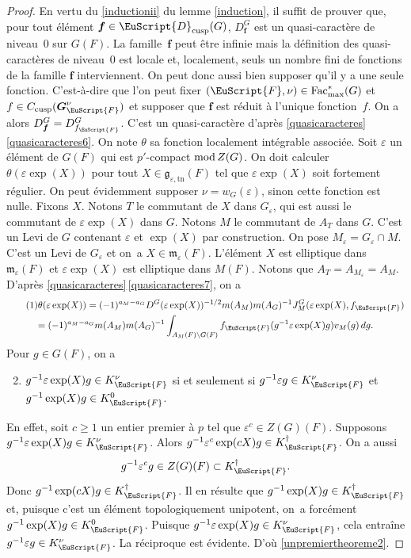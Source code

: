 \documentclass[JEP,XML,SOM,Unicode,francais]{cedram}
\let\mathcal \EuScript
\let\epsilon\varepsilon
\newcommand{\rmod}{\textup{mod}\,}
\newcommand{\frg}{\mathfrak{g}}
\newcommand{\mfrm}{\mathfrak{m}}
\newcommand{\cusp}{\mathrm{cusp}}
\newcommand{\Fac}{\mathrm{Fac}}
\newcommand{\tn}{\mathrm{tn}}
\newcommand{\bmf}{\boldsymbol{f}}
\newcommand{\bG}{\boldsymbol{G}}
\newcommand{\cD}{\mathcal{D}}
\newcommand{\cF}{\mathcal{F}}
\theoremstyle{plain}
\theoremstyle{definition}
\begin{document}
\begin{proof}
En vertu du \eqref{inductionii} du lemme \ref{induction}, il suffit de prouver que, pour tout élément $\bmf\in \cD_{\cusp}(G)$, $D^G_{\bmf}$ est un quasi-caractère de niveau~$0$ sur $G(F)$. La famille~$\bmf$ peut être infinie mais la définition des quasi-caractères de niveau~$0$ est locale et, loca\-lement, seuls un nombre fini de fonctions de la famille $\bmf$ interviennent. On peut donc aussi bien supposer qu'il y a une seule fonction. C'est-à-dire que l'on peut fixer $(\cF,\nu)\in \Fac^*_{\max}(G)$ et $f\in C_{\cusp}(\bG_{\cF}^{\nu})$ et supposer que $\bmf$ est réduit à l'unique fonction~$f$. On a alors $D^G_{\bmf}=D^G_{f_{\cF}}$. C'est un quasi-caractère d'après \ref{quasicaracteres}\,\eqref{quasicaracteres6}. On note $\theta$ sa fonction localement intégrable associée. Soit $\epsilon$ un élément de $G(F)$ qui est $p'$-compact $\rmod Z(G)$. On doit calculer $\theta(\epsilon \exp(X))$ pour tout $X\in \frg_{\epsilon,\tn}(F)$ tel que $\epsilon \exp(X)$ soit fortement régulier. On peut évidemment supposer $\nu=w_{G}(\epsilon)$, sinon cette fonction est nulle. Fixons $X$. Notons $T$ le commutant de $X$ dans $G_{\epsilon}$, qui est aussi le commutant de $\epsilon \exp(X)$ dans $G$. Notons $M$ le commutant de $A_{T}$ dans $G$. C'est un Levi de $G$ contenant $\epsilon$ et $\exp(X)$ par construction. On pose $M_{\epsilon}=G_{\epsilon}\cap M$. C'est un Levi de $G_{\epsilon}$ et on~a $X\in \mfrm_{\epsilon}(F)$. L'élément $X$ est elliptique dans $\mfrm_{\epsilon}(F)$ et $\epsilon \exp(X)$ est elliptique dans $M(F)$. Notons que $A_{T}=A_{M_{\epsilon}}=A_{M}$. D'après \ref{quasicaracteres}\,\eqref{quasicaracteres7}, on a
\begin{multline}\tag{1}\label{unpremiertheoreme1}
\theta(\epsilon \exp(X))=(-1)^{a_{M}-a_{G}}D^G(\epsilon \exp(X))^{-1/2}m(A_{M})m(A_{G})^{-1}J^G_{M}(\epsilon \exp(X),f_{\cF})
\\
=(-1)^{a_{M}-a_{G}}m(A_{M})m(A_{G})^{-1} \int_{A_{M}(F)\backslash G(F)}f_{\cF}(g^{-1} \epsilon \exp(X)g)v_{M}(g)\, dg.
\end{multline}
Pour $g\in G(F)$, on a
\begin{enumerate}\setcounter{enumi}{1}
\item\label{unpremiertheoreme2}
$g^{-1}\epsilon \exp(X)g\in K_{\cF}^{\nu}$ si et seulement si $g^{-1}\epsilon g\in K_{\cF}^{\nu}$ et $g^{-1} \exp(X)g\in K_{\cF}^0$.
\end{enumerate}

En effet, soit $c\geq1$ un entier premier à $p$ tel que $\epsilon^c\in Z(G)(F)$. Supposons $g^{-1}\epsilon \exp(X)g\in K_{\cF}^{\nu}$. Alors $g^{-1} \epsilon^c\exp(cX)g\in K_{\cF}^{\dag}$. On a aussi
\[
g^{-1}\epsilon^cg\in Z(G)(F)\subset K_{\cF}^{\dag}.
\]
Donc $g^{-1}\exp(cX)g\in K_{\cF}^{\dag}$. Il en résulte que $g^{-1}\exp(X)g\in K_{\cF}^{\dag}$ et, puisque c'est un élément topologiquement unipotent, on~a forcément $g^{-1}\exp(X)g\in K_{\cF}^0$. Puisque $g^{-1}\epsilon \exp(X)g\in K_{\cF}^{\nu}$, cela entraîne $g^{-1}\epsilon g\in K_{\cF}^{\nu}$. La réciproque est évidente. D'où \eqref{unpremiertheoreme2}.


\end{proof}
\end{document}
